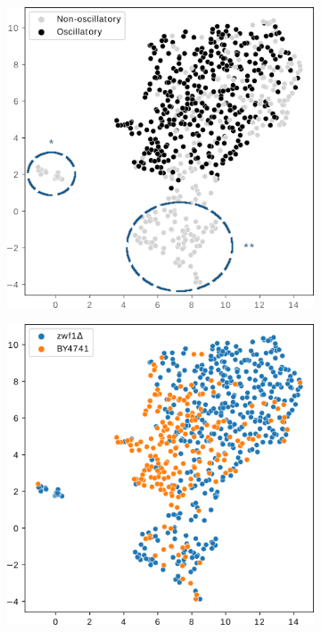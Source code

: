 \begin{figure}
  \centering
  \begin{subfigure}[t]{0.5\textwidth}
  \centering
    \includegraphics[width=\linewidth]{umap_single_is20016_2_edit2.png}
    \caption{
    }
    \label{fig:umap-osc}
  \end{subfigure}%
  \begin{subfigure}[t]{0.5\textwidth}
  \centering
    \includegraphics[width=\linewidth]{umap_single_is20016_1_edit.png}
    \caption{
    }
    \label{fig:umap-strain}
  \end{subfigure}


\end{figure}
